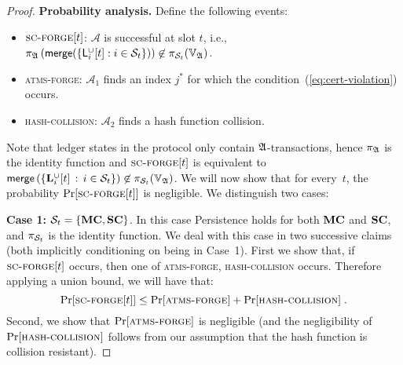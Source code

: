 \begin{proof}
  \bigskip
  \textbf{Probability analysis.}
  Define the following events:
  \begin{itemize}
    \item $\textsc{sc-forge}[t]$: $\mathcal{A}$ is successful at slot $t$, i.e.,
          $\pi_{\mathfrak{A}}\left(\mathsf{merge}(\{\mathsf{L}_i^{\cup}[t]: i \in \mathcal{S}_t\})\right) \not\in
          \pi_{\mathcal{S}_t}(\mathbb{V}_{\mathfrak{A}})$.
    \item \textsc{atms-forge}:  $\mathcal{A}_1$ finds an
          index $j^*$ for which the condition~(\ref{eq:cert-violation}) occurs.
    \item \textsc{hash-collision}:  $\mathcal{A}_2$ finds a
          hash function collision.
  \end{itemize}
  Note that ledger states in the protocol only contain $\mathfrak{A}$-transactions,
  hence
  $\pi_{\mathfrak{A}}$ is the identity function and
  $\textsc{sc-forge}[t]$ is equivalent to
  $
  \mathsf{merge}\left(
    \left\{ \mathbf{L}_i^{\cup}[t] \,:\, i\in\mathcal{S}_t \right\}
  \right)
  \not\in
  \pi_{\mathcal{S}_t}(\mathbb{V}_{\mathfrak{A}})
  $.
  We will now show that for every~$t$, the probability $\Pr[\textsc{sc-forge}[t]]$ is
  negligible.
  We distinguish two cases:

  \textbf{Case 1:}
  $\mathcal{S}_t = \{\mathbf{MC},\mathbf{SC}\}$.
  In this case Persistence holds for both $\mathbf{MC}$ and $\mathbf{SC}$,
  and $\pi_{\mathcal{S}_t}$ is the identity function.
  We deal with this case in two successive claims (both implicitly conditioning
  on being in Case~1).
  First we show that, if $\textsc{sc-forge}[t]$ occurs, then one of
  \textsc{atms-forge}, \textsc{hash-collision} occurs.
  Therefore applying a union bound, we will have that:
  \begin{equation*}
    \label{ineq}
  \Pr[\textsc{sc-forge}[t]] \leq \Pr[\textsc{atms-forge}] + \Pr[\textsc{hash-collision}]
  \; .
  \end{equation*}
  Second, we show that $\Pr[\textsc{atms-forge}]$ is
  negligible (and the negligibility of $\Pr[\textsc{hash}\-\text{-}\-\textsc{collision}]$ follows from our assumption
  that the hash function is collision resistant).


\end{proof}
